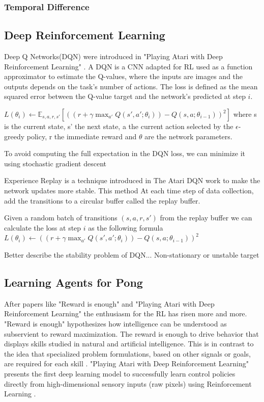 \subsubsection{Temporal Difference}

\subsection{Deep Reinforcement Learning}
Deep Q Networks(DQN) were introduced in "Playing Atari with Deep Reinforcement Learning" \cite{mnih2013playing}.
A DQN is a CNN adapted for RL used as a function approximator to estimate the Q-values, where the inputs are images and the outputs depends on the task's number of actions.
The loss is defined as the mean squared error between the Q-value target and the network's predicted at step $i$.

$L(\theta_i) \leftarrow \mathbb{E}_{s, a, r, s'} [((r + \gamma \max_{a'} Q(s', a'; \theta_i)) - Q(s, a; \theta_{i-1}))^2]$
where s is the current state, s' the next state, a the current action selected by the $\epsilon$-greedy policy, r the immediate reward and $\theta$ are the network parameters.

To avoid computing the full expectation in the DQN loss, we can minimize it using stochastic gradient descent

Experience Replay is a technique introduced in The Atari DQN work to make the network updates more stable.
This method At each time step of data collection, add the transitions to a circular buffer called the replay buffer.

Given a random batch of transitions $(s, a, r, s')$ from the replay buffer we can calculate the loss at step $i$ as the following formula
$L(\theta_i) \leftarrow ((r + \gamma \max_{a'} Q(s', a'; \theta_i)) - Q(s, a; \theta_{i-1}))^2$

Better describe the stability problem of DQN... Non-stationary or unstable target


\subsection*{Learning Agents for Pong}

After papers like "Reward is enough"\cite{silver2021reward} and "Playing Atari with Deep Reinforcement Learning"\cite{mnih2013playing} the enthusiasm for the RL has risen more and more.
"Reward is enough" hypothesizes how intelligence can be understood as subservient to reward maximization. The reward is enough to drive behavior that displays skills studied in natural and artificial intelligence. This is in contrast to the idea that specialized problem formulations, based on other signals or goals, are required for each skill \cite{silver2021reward}.
"Playing Atari with Deep Reinforcement Learning" presents the first deep learning model to successfully learn control policies directly from high-dimensional sensory inputs (raw pixels) using Reinforcement Learning \cite{mnih2013playing}.


